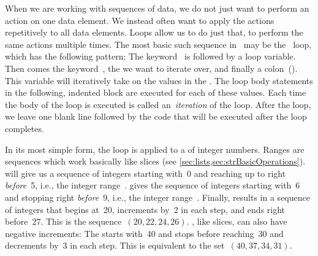 %
%
When we are working with sequences of data, we do not just want to perform an action on one data element.
We instead often want to apply the actions repetitively to all data elements.
Loops allow us to do just that, to perform the same actions multiple times.%
%
%
%
%
%
The most basic such sequence in \python\ may be the ~loop, which has the following pattern:%
%
%
%
%
%
%
%
%
%
The keyword~ is followed by a loop variable.
Then comes the keyword~, the  we want to iterate over, and finally a colon~(\pythonilIdx{:}).
This variable will iteratively take on the values in the .
The loop body statements in the following, indented block are executed for each of these values.
Each time the body of the loop is executed is called an~\emph{iteration} of the loop.
After the loop, we leave one blank line followed by the code that will be executed after the loop completes.

In its most simple form, the  loop is applied to a  of integer numbers.
Ranges are sequences which work basically like slices (see \cref{sec:lists,sec:strBasicOperations}).
 will give us a sequence of integers starting with~0 and reaching up to right \emph{before}~5, i.e., the integer range~.
 gives the sequence of integers starting with~6 and stopping right \emph{before}~9, i.e., the integer range~.
Finally,  results in a sequence of integers that begins at~20, increments by~2 in each step, and ends right before~27.
This is the sequence~$(20, 22, 24, 26)$.
, like slices, can also have negative increments:
The  starts with~40 and stops before reaching~30 and decrements by~3 in each step.
This is equivalent to the set~$(40, 37, 34, 31)$.

